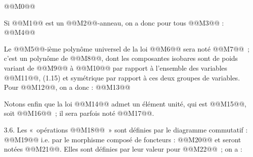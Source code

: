 
@@M0@@

Si @@M1@@ est un @@M2@@-anneau, on a donc pour tous @@M3@@ :
@@M4@@

Le @@M5@@-ième polynôme universel de la loi @@M6@@ sera noté @@M7@@~; c'est un polynôme de @@M8@@, dont les composantes isobares sont de poids variant de @@M9@@ à @@M10@@ par rapport à l'ensemble des variables @@M11@@, (1.15) et symétrique par rapport à ces deux groupes de variables. Pour @@M12@@, on a donc :
@@M13@@

Notons enfin que la loi @@M14@@ admet un élément unité, qui est @@M15@@, soit @@M16@@~; il sera parfois noté @@M17@@.

3.6. Les «~opérations @@M18@@~» sont définies par le diagramme commutatif :
@@M19@@
i.e. par le morphisme composé de foncteurs :
@@M20@@
et seront notées @@M21@@. Elles sont définies par leur valeur pour @@M22@@~; on a :
